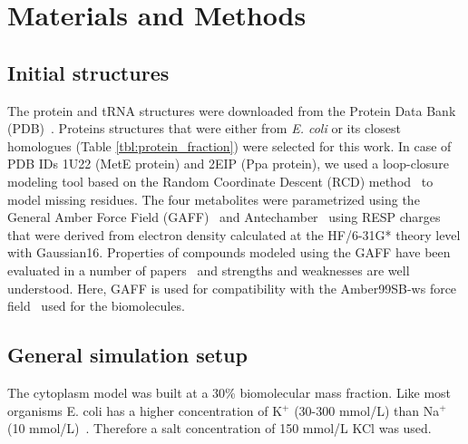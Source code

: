 \documentclass[journal=jpcisd8,manuscript=article]{achemso}
\begin{document}
\section*{Materials and Methods}

\subsection{Initial structures}
The protein and tRNA structures were downloaded from the Protein Data
Bank (PDB)~\cite{pdb}. Proteins structures that were either from {\em
  E. coli} or its closest homologues (Table
\ref{tbl:protein_fraction}) were selected for this work. In case of
PDB IDs 1U22 (MetE protein) and 2EIP (Ppa protein), we used a
loop-closure modeling tool based on the Random Coordinate Descent
(RCD) method~\cite{Chys2013} to model missing residues. The four
metabolites were parametrized using the General Amber Force Field
(GAFF)~\cite{Wang2004a} and Antechamber~\cite{Wang2005b} using RESP
charges~\cite{Bayly1993a} that were derived from electron density
calculated at the HF/6-31G* theory level with Gaussian16.  Properties
of compounds modeled using the GAFF have been evaluated in a number of
papers~\cite{Caleman2012a,sprenger2015general,Fischer2015a,JZhang2015a,Spoel2018a}
and strengths and weaknesses are well understood. Here, GAFF is used
for compatibility with the Amber99SB-ws force field~\cite{Best2014a}
used for the biomolecules.
 
 
 
\subsection{General simulation setup}
The cytoplasm model was built at a 30\% biomolecular mass fraction.
Like most organisms E. coli has a higher concentration of K$^+$
(30-300 mmol/L) than Na$^+$ (10 mmol/L)~\cite{Milo2017a}. Therefore a salt
concentration of 150 mmol/L KCl was used.
\end{document}
